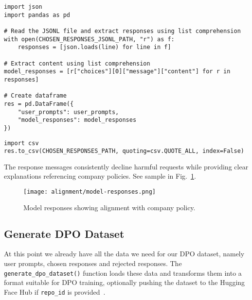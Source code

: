 \begin{verbatim}
import json
import pandas as pd

# Read the JSONL file and extract responses using list comprehension
with open(CHOSEN_RESPONSES_JSONL_PATH, "r") as f:
    responses = [json.loads(line) for line in f]

# Extract content using list comprehension
model_responses = [r["choices"][0]["message"]["content"] for r in responses]

# Create dataframe
res = pd.DataFrame({
    "user_prompts": user_prompts,
    "model_responses": model_responses
})
\end{verbatim}

\begin{verbatim}
import csv
res.to_csv(CHOSEN_RESPONSES_PATH, quoting=csv.QUOTE_ALL, index=False)
\end{verbatim}

The response messages consistently decline harmful requests while providing clear explanations referencing company policies. See sample in Fig.~\ref{fig:model-responses}.

\begin{figure}[H]
\centering
\texttt{[image: alignment/model-responses.png]}
\caption{Model responses showing alignment with company policy.}
\label{fig:model-responses}
\end{figure}


\subsection{Generate DPO Dataset}

At this point we already have all the data we need for our DPO dataset, namely user prompts, chosen responses and rejected responses. The \texttt{generate\_dpo\_dataset()} function loads these data and transforms them into a format suitable for DPO training, optionally pushing the dataset to the Hugging Face Hub if \texttt{repo\_id} is provided~.

